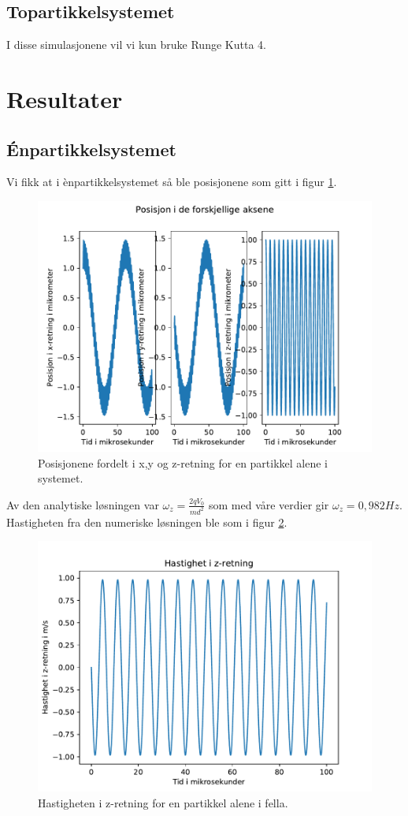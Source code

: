\documentclass[reprint,english,notitlepage]{revtex4-1}  %
\begin{document}
\subsection*{Topartikkelsystemet}
I disse simulasjonene vil vi kun bruke Runge Kutta 4.
\section{Resultater}

\subsection*{Énpartikkelsystemet}
Vi fikk at i ènpartikkelsystemet så ble posisjonene som gitt i figur \ref{r1pos}.
\begin{figure}
	\label{r1pos}
	\centering 
	\includegraphics[scale=0.4]{../pythonplots/r1pos.pdf}
	\caption{Posisjonene fordelt i x,y og z-retning for en partikkel alene i systemet.}
\end{figure}
Av den analytiske løsningen var $\omega_z=\frac{2qV_0}{md^2}$ som med våre verdier gir $\omega_z=0,982Hz$.
Hastigheten fra den numeriske løsningen ble som i figur \ref{v1z}.
\begin{figure}
	\label{v1z}
	\centering 
	\includegraphics[scale=0.4]{../pythonplots/vz.pdf}
	\caption{Hastigheten i z-retning for en partikkel alene i fella.}
\end{figure}
\end{document}
